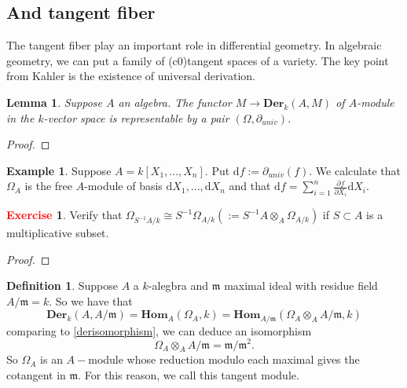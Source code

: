 \documentclass[12pt,a4paper,english]{article}
\theoremstyle{plain}
\newtheorem{lem}[thm]{Lemma}
\theoremstyle{definition}
\newtheorem{defi}{Definition}
\newtheorem*{example}{Example}
\newtheorem{exercise}{\textbf{\textcolor{red}{Exercise}}}
\theoremstyle{remark}
\newcommand{\homo}{\mathbf{Hom}}
\newcommand{\dif}{\text{d}}
\newcommand{\der}{\textbf{Der}}
\begin{document}
\subsection{And tangent fiber}
The tangent fiber play an important role in differential geometry. In algebraic geometry, we can put a family of (c0)tangent spaces of a variety. The key point from Kahler is the existence of universal derivation.
\begin{lem}
Suppose $A$ an algebra. The functor $M\rightarrow \der_{k}(A,M)$ of $A$-module in the $k$-vector space is representable by a pair $(\Omega, \partial_{univ})$.
\end{lem}
\begin{proof}

\end{proof}
\begin{example}
Suppose $A=k[X_{1},...,X_{n}]$. Put $\dif f:=\partial_{univ}(f)$. We calculate that $\Omega_{A}$ is the free $A$-module of basis $\dif X_{1},...,\dif X_{n}$ and that $\dif f=\sum^{n}_{i=1}\frac{\partial f}{\partial X_{i}}\dif X_{i}$.
\end{example}
\begin{exercise}
Verify that $\Omega_{S^{-1}A/k}\cong S^{-1}\Omega_{A/k}(:=S^{-1}A\otimes_{A}\Omega_{A/k})$ if $S\subset A$ is a multiplicative subset. 
\end{exercise}
\begin{tcolorbox}
\begin{proof}

\end{proof}
\end{tcolorbox}
\begin{defi}
Suppose $A$ a $k$-alegbra and $\mathfrak{m}$ maximal ideal with residue field $A/\mathfrak{m}=k$. So we have that 
\begin{equation*}
    \der_{k}(A,A/\mathfrak{m})=\homo_{A}(\Omega_{A},k)=\homo_{A/\mathfrak{m}}(\Omega_{A}\otimes_{A}A/\mathfrak{m},k)
\end{equation*}
comparing to  \ref{derisomorphism}, we can deduce an isomorphism 
\begin{equation*}
    \Omega_{A}\otimes_{A}A/\mathfrak{m}=\mathfrak{m}/\mathfrak{m}^{2}.
\end{equation*}
So $\Omega_{A}$ is an $A-$module whose reduction modulo each maximal gives the cotangent in $\mathfrak{m}$. For this reason, we call this tangent module.
\end{defi}
\end{document}
